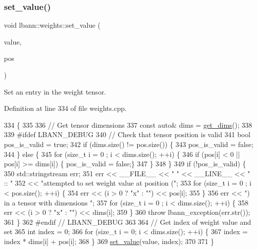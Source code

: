 \subsubsection{\texorpdfstring{set\+\_\+value()}{set\_value()}\hspace{0.1cm}{\footnotesize\ttfamily [2/3]}}
{\footnotesize\ttfamily void lbann\+::weights\+::set\+\_\+value (\begin{DoxyParamCaption}\item[{Data\+Type}]{value,  }\item[{std\+::vector$<$ int $>$}]{pos }\end{DoxyParamCaption})}

Set an entry in the weight tensor. 

Definition at line 334 of file weights.\+cpp.


\begin{DoxyCode}
334                                                           \{
335 
336   \textcolor{comment}{// Get tensor dimensions}
337   \textcolor{keyword}{const} \textcolor{keyword}{auto}& dims = \hyperlink{classlbann_1_1weights_ac1f4e6725fc8b265e0ed5dfe140a321a}{get\_dims}();
338 
339 \textcolor{preprocessor}{#ifdef LBANN\_DEBUG}
340   \textcolor{comment}{// Check that tensor position is valid}
341   \textcolor{keywordtype}{bool} pos\_is\_valid = \textcolor{keyword}{true};
342   \textcolor{keywordflow}{if} (dims.size() != pos.size()) \{
343     pos\_is\_valid = \textcolor{keyword}{false};
344   \} \textcolor{keywordflow}{else} \{
345     \textcolor{keywordflow}{for} (\textcolor{keywordtype}{size\_t} i = 0 ; i < dims.size(); ++i) \{
346       \textcolor{keywordflow}{if} (pos[i] < 0 || pos[i] >= dims[i]) \{ pos\_is\_valid = \textcolor{keyword}{false};\}
347     \}
348   \}
349   \textcolor{keywordflow}{if} (!pos\_is\_valid) \{
350     std::stringstream err;
351     err << \_\_FILE\_\_ << \textcolor{stringliteral}{" "} << \_\_LINE\_\_ << \textcolor{stringliteral}{" :: "}
352         << \textcolor{stringliteral}{"attempted to set weight value at position ("};
353     \textcolor{keywordflow}{for} (\textcolor{keywordtype}{size\_t} i = 0 ; i < pos.size(); ++i) \{
354       err << (i > 0 ? \textcolor{stringliteral}{"x"} : \textcolor{stringliteral}{""}) << pos[i];
355     \}
356     err << \textcolor{stringliteral}{") in a tensor with dimensions "};
357     \textcolor{keywordflow}{for} (\textcolor{keywordtype}{size\_t} i = 0 ; i < dims.size(); ++i) \{
358       err << (i > 0 ? \textcolor{stringliteral}{"x"} : \textcolor{stringliteral}{""}) << dims[i];
359     \}
360     \textcolor{keywordflow}{throw} lbann\_exception(err.str());
361   \}
362 \textcolor{preprocessor}{#endif // LBANN\_DEBUG}
363 
364   \textcolor{comment}{// Get index of weight value and set}
365   \textcolor{keywordtype}{int} index = 0;
366   \textcolor{keywordflow}{for} (\textcolor{keywordtype}{size\_t} i = 0; i < dims.size(); ++i) \{
367     index = index * dims[i] + pos[i];
368   \}
369   \hyperlink{classlbann_1_1weights_aaae37ad2df0808eb606609cd58cd223b}{set\_value}(value, index);
370 
371 \}
\end{DoxyCode}
